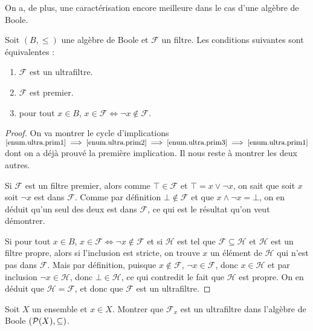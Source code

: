 On a, de plus, une caractérisation encore meilleure dans le cas d'une algèbre de
Boole.

\begin{proposition}
  Soit $(B,\leq)$ une algèbre de Boole et $\mathcal F$ un filtre. Les conditions
  suivantes sont équivalentes :
  \begin{enumerate}[label=(\roman*)]
  \item \label{enum.ultra.prim1} $\mathcal F$ est un ultrafiltre.
  \item \label{enum.ultra.prim2} $\mathcal F$ est premier.
  \item \label{enum.ultra.prim3} pour tout $x\in B$,
    $x\in \mathcal F \iff \lnot x \notin\mathcal F$.
  \end{enumerate}
\end{proposition}

\begin{proof}
  On va montrer le cycle d'implications
  $\ref{enum.ultra.prim1} \implies\ref{enum.ultra.prim2}
  \implies\ref{enum.ultra.prim3}\implies\ref{enum.ultra.prim1}$
  dont on a déjà prouvé la première implication. Il nous reste à montrer les
  deux autres.
  
  Si $\mathcal F$ est un filtre premier, alors comme $\top \in \mathcal F$ et
  $\top = x \lor \lnot x$, on sait que soit $x$ soit $\lnot x$ est dans
  $\mathcal F$. Comme par définition $\bot\notin\mathcal F$ et que
  $x\land\lnot x = \bot$, on en déduit qu'un seul des deux est dans
  $\mathcal F$, ce qui est le résultat qu'on veut démontrer.

  Si pour tout $x\in B$, $x\in\mathcal F\iff\lnot x\notin\mathcal F$ et
  si $\mathcal H$ est tel que $\mathcal F\subseteq\mathcal H$ et $\mathcal H$
  est un filtre propre, alors si l'inclusion est stricte, on trouve $x$ un
  élément de $\mathcal H$ qui n'est pas dans $\mathcal F$. Mais par définition,
  puisque $x\notin\mathcal F$, $\lnot x\in\mathcal F$, donc $x\in \mathcal H$ et
  par inclusion $\lnot x \in \mathcal H$, donc $\bot\in \mathcal H$, ce qui
  contredit le fait que $\mathcal H$ est propre. On en déduit que
  $\mathcal H = \mathcal F$, et donc que $\mathcal F$ est un ultrafiltre.
\end{proof}

\begin{exercise}
  Soit $X$ un ensemble et $x\in X$. Montrer que $\mathcal F_x$ est un
  ultrafiltre dans l'algèbre de Boole $(\mathcal{P}(X),\subseteq)$.
\end{exercise}

